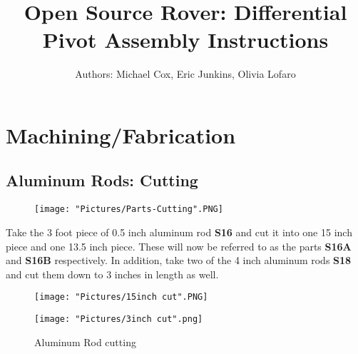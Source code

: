 \documentclass[12pt]{article}
\begin{document}
\title{Open Source Rover: Differential Pivot Assembly Instructions}
\author{Authors: Michael Cox, Eric Junkins, Olivia Lofaro}

\makeatletter         
\def\@maketitle{
\begin{center}	
	\makebox[\textwidth][c]{ \texttt{[image: "Pictures/Differential Pivot".png]}}
	{\Huge \bfseries \sffamily \@title }\\[3ex] 
	{\Large \sffamily \@author}\\[3ex] 
	\texttt{[image: "Pictures/JPL logo".png]}
\end{center}}
\makeatother

\maketitle



\newpage


\tableofcontents

\newpage


\section{Machining/Fabrication}
\subsection{Aluminum Rods: Cutting}

\begin{figure}[H]
	\centering
	\texttt{[image: "Pictures/Parts-Cutting".PNG]}
\end{figure}


Take the 3 foot piece of 0.5 inch aluminum rod \textbf{S16} and cut it into one 15 inch piece and one 13.5 inch piece. These will now be referred to as the parts \textbf{S16A} and \textbf{S16B} respectively. In addition, take two of the 4 inch aluminum rods \textbf{S18} and cut them down to 3 inches in length as well.  

\begin{figure}[H]
  \centering
  \begin{minipage}[b]{0.45\textwidth}
    \texttt{[image: "Pictures/15inch cut".PNG]}
  \end{minipage}
  \hfill
  \begin{minipage}[b]{0.45\textwidth}
    \texttt{[image: "Pictures/3inch cut".png]}
  \end{minipage}
  \caption{Aluminum Rod cutting}
  \label{Al dimensions}
\end{figure}
\end{document}
